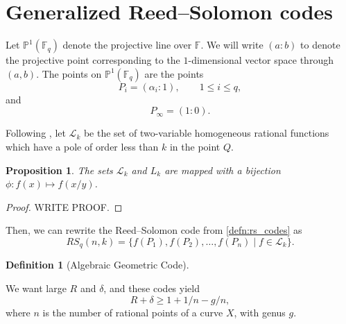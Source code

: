 \documentclass[11pt]{amsart}
\newtheorem{prop}[thm]{Proposition}
\theoremstyle{definition}
\newtheorem{defn}[thm]{Definition}
\theoremstyle{example}
\theoremstyle{remark}
\numberwithin{equation}{section}
\begin{document}

\section{Generalized Reed--Solomon codes} \label{s:grs}
Let $\mathbb{P}^1(\mathbb{F}_q)$ denote the projective line over $\mathbb{F}$. We will write $(a : b)$ to denote the projective point corresponding to the $1$-dimensional vector space through $(a, b)$. The points on $\mathbb{P}^1(\mathbb{F}_q)$ are the points
\begin{equation}
	P_i = (\alpha_i : 1), \qquad 1 \le i \le q,
\end{equation}
and
\begin{equation}
	P_\infty = (1 : 0).
\end{equation}

Following \cite{LS87}, let $\mathcal L_k$ be the set of two-variable homogeneous rational functions which have a pole of order less than $k$ in the point $Q$.

\begin{prop}
	The sets $\mathcal L_k$ and $L_k$ are mapped with a bijection $\phi: f(x) \mapsto f(x/y)$.
\end{prop}
\begin{proof}
	WRITE PROOF.
\end{proof}

Then, we can rewrite the Reed--Solomon code from \ref{defn:rs_codes} as
\begin{equation}
	RS_q(n, k) = \{f(P_1), f(P_2), \dots, f(P_n) \mid f \in \mathcal L_k\}.
\end{equation}



\begin{defn}[Algebraic Geometric Code]
\end{defn}

We want large $R$ and $\delta$, and these codes yield 
	\begin{equation}
		\label{eq:g/n} R + \delta \ge 1 + 1/n - g/n,
	\end{equation}
where $n$ is the number of rational points of a curve $X$, with genus $g$.
\end{document}
